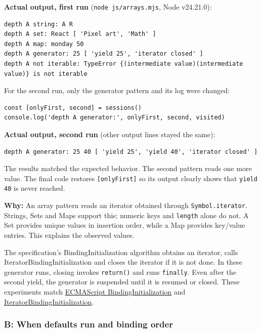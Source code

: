 \documentclass[
  11pt,
]{article}
\newcommand{\passthrough}[1]{#1}
\begin{document}
\textbf{Actual output, first run}
(\passthrough{\lstinline!node js/arrays.mjs!}, Node v24.21.0):

\begin{lstlisting}
depth A string: A R
depth A set: React [ 'Pixel art', 'Math' ]
depth A map: monday 50
depth A generator: 25 [ 'yield 25', 'iterator closed' ]
depth A not iterable: TypeError {(intermediate value)(intermediate value)} is not iterable
\end{lstlisting}

For the second run, only the generator pattern and its log were changed:

\begin{lstlisting}
const [onlyFirst, second] = sessions()
console.log('depth A generator:', onlyFirst, second, visited)
\end{lstlisting}

\textbf{Actual output, second run} (other output lines stayed the same):

\begin{lstlisting}
depth A generator: 25 40 [ 'yield 25', 'yield 40', 'iterator closed' ]
\end{lstlisting}

The results matched the expected behavior. The second pattern reads one
more value. The final code restores
\passthrough{\lstinline![onlyFirst]!} so its output clearly shows that
\passthrough{\lstinline!yield 40!} is never reached.

\textbf{Why:} An array pattern reads an iterator obtained through
\passthrough{\lstinline!Symbol.iterator!}. Strings, Sets and Maps
support this; numeric keys and \passthrough{\lstinline!length!} alone do
not. A Set provides unique values in insertion order, while a Map
provides key/value entries. This explains the observed values.

The specification's BindingInitialization algorithm obtains an iterator,
calls IteratorBindingInitialization and closes the iterator if it is not
done. In these generator runs, closing invokes
\passthrough{\lstinline!return()!} and runs
\passthrough{\lstinline!finally!}. Even after the second yield, the
generator is suspended until it is resumed or closed. These experiments
match
\href{https://262.ecma-international.org/16.0/\#sec-runtime-semantics-bindinginitialization}{ECMAScript
BindingInitialization} and
\href{https://262.ecma-international.org/16.0/\#sec-runtime-semantics-iteratorbindinginitialization}{IteratorBindingInitialization}.

\subsubsection{B: When defaults run and binding
order}\label{b-when-defaults-run-and-binding-order}
\end{document}
